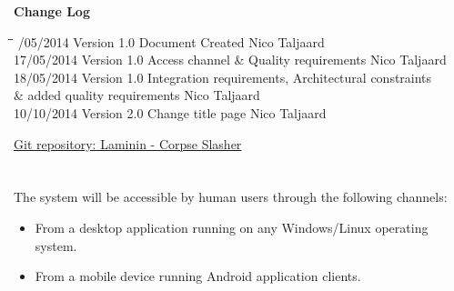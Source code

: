 \documentclass[letterpaper]{article}
\begin{document}

	\newpage
		{\LARGE \bf Change Log}\\[2em]
		
		\begin{tabbing}
			\hspace*{2.5cm}\=\hspace*{2.5cm}\=\hspace*{8cm}\=\hspace*{3cm} /05/2014	\> Version 1.0	\> Document Created 							\> Nico Taljaard \\
			17/05/2014	\> Version 1.0	\> Access channel \& Quality requirements		\> Nico Taljaard \\
			18/05/2014	\> Version 1.0	\> Integration requirements, Architectural constraints \\
						\>				\>	\& added quality requirements 				\> Nico Taljaard \\
			10/10/2014	\> Version 2.0	\> Change title page							\> Nico Taljaard \\
		\end{tabbing}
		
	\newpage
		\renewcommand\contentsname{TABLE OF CONTENTS}
		\newcommand\contentsnameLC{\colorbox{black}{\makebox[\textwidth-2\fboxsep][l]{\bfseries\color{red} Table of Contents}}}
		
		\renewcommand{\cftdot}{}
		\hypersetup{linktocpage}
		\tableofcontents
		
		\begin{flushleft}
			\LARGE\href{https://github.com/njTaljaard/Laminin_CorpseSlasher/}{Git repository: Laminin - Corpse Slasher}
		\end{flushleft}
		
	\newpage
		
		\section*{\colorbox{black}{}} 
		\vspace{0.1in}
		
		The system will be accessible by human users through the following channels:
		\begin{itemize}
			\item From a desktop application running on any Windows/Linux operating system.
			\item From a mobile device running Android application clients.
		\end{itemize}
		
\end{document}
